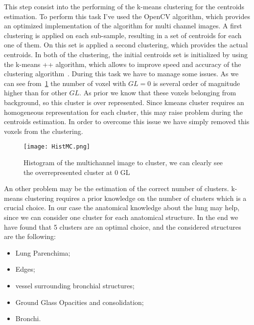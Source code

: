 		This step consist into the performing of the k-means clustering for the centroids estimation. To perform this task I've used the OpenCV algorithm, which provides an optimized implementation of the algorithm for multi channel images. A first clustering is applied on each sub-sample, resulting in a set of centroids for each one of them. On this set is applied a second clustering, which provides the actual centroids. In both of the clustering, the initial centroids set is initialized by using the k-means ++ algorithm, which allows to improve speed and accuracy of the clustering algorithm~\cite{Arthur2007}.
		During this task we have to manage some issues. As we can see from \figurename\,\ref{fig:ClusteringHistogram} the number of voxel with $GL = 0$  is several order of magnitude higher than for other $GL$. As prior we know that these voxels belonging from background, so this cluster is over represented. Since kmeans cluster requires an homogeneous representation for each cluster, this may raise problem during the centroids estimation. In order to overcome this issue we have simply removed this voxels from the clustering.  
		

		\begin{figure}[h!]
			\centering
				\texttt{[image: HistMC.png]}
				\caption{Histogram of the multichannel image to cluster, we can clearly see the overrepresented cluster at $0$ GL}	\label{fig:ClusteringHistogram}
		\end{figure}
		
	An other problem may be the estimation of the correct number of clusters. k-means clustering requires a prior knowledge on the number of clusters which is a crucial choice. In our case the anatomical knowledge about the lung may help, since we can consider one cluster for each anatomical structure. In the end we have found that 5 clusters are an optimal choice, and the considered structures are the following: 
	\begin{itemize}
		\item Lung Parenchima;
		
		\item Edges;
		
		\item vessel surrounding bronchial structures;
		
		\item Ground Glass Opacities and consolidation;
		
		\item Bronchi.

	\end{itemize}

